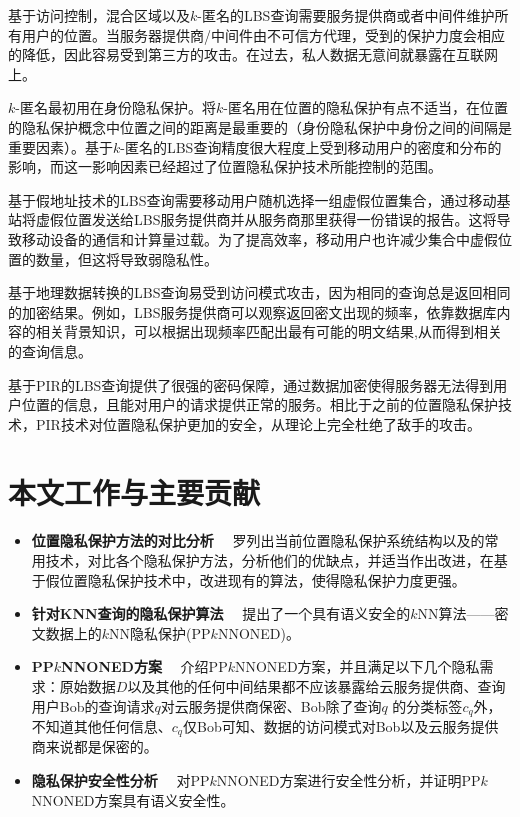 基于访问控制，混合区域以及{$k$}-匿名的LBS查询需要服务提供商或者中间件维护所有用户的位置。当服务器提供商/中间件由不可信方代理，受到的保护力度会相应的降低，因此容易受到第三方的攻击。在过去，私人数据无意间就暴露在互联网上。

{$k$}-匿名最初用在身份隐私保护。将{$k$}-匿名用在位置的隐私保护有点不适当，在位置的隐私保护概念中位置之间的距离是最重要的（身份隐私保护中身份之间的间隔是重要因素）。基于{$k$}-匿名的LBS查询精度很大程度上受到移动用户的密度和分布的影响，而这一影响因素已经超过了位置隐私保护技术所能控制的范围。

基于假地址技术的LBS查询需要移动用户随机选择一组虚假位置集合，通过移动基站将虚假位置发送给LBS服务提供商并从服务商那里获得一份错误的报告。这将导致移动设备的通信和计算量过载。为了提高效率，移动用户也许减少集合中虚假位置的数量，但这将导致弱隐私性。

基于地理数据转换的LBS查询易受到访问模式攻击\cite{Williams}，因为相同的查询总是返回相同的加密结果。例如，LBS服务提供商可以观察返回密文出现的频率，依靠数据库内容的相关背景知识，可以根据出现频率匹配出最有可能的明文结果,从而得到相关的查询信息。

基于PIR的LBS查询提供了很强的密码保障，通过数据加密使得服务器无法得到用户位置的信息，且能对用户的请求提供正常的服务。相比于之前的位置隐私保护技术，PIR技术对位置隐私保护更加的安全，从理论上完全杜绝了敌手的攻击。


\section{本文工作与主要贡献}
\begin{itemize}
  \item \textbf{位置隐私保护方法的对比分析} ~~罗列出当前位置隐私保护系统结构以及的常用技术，对比各个隐私保护方法，分析他们的优缺点，并适当作出改进，在基于假位置隐私保护技术中，改进现有的算法，使得隐私保护力度更强。
  \item \textbf{针对KNN查询的隐私保护算法} ~~提出了一个具有语义安全的$k$NN算法——密文数据上的$k$NN隐私保护(PP$k$NNONED)。
  \item \textbf{PP$k$NNONED方案} ~~介绍PP$k$NNONED方案，并且满足以下几个隐私需求：原始数据$D$以及其他的任何中间结果都不应该暴露给云服务提供商、查询用户Bob的查询请求$q$对云服务提供商保密、Bob除了查询$q$ 的分类标签$c_q$外，不知道其他任何信息、$c_q$仅Bob可知、数据的访问模式对Bob以及云服务提供商来说都是保密的。
  \item \textbf{隐私保护安全性分析} ~~对PP$k$NNONED方案进行安全性分析，并证明PP$k$NNONED方案具有语义安全性。
\end{itemize}
